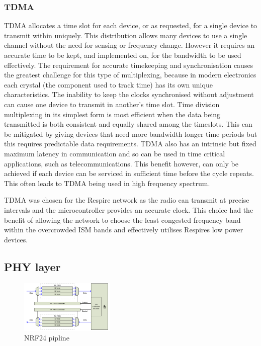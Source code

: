 \subsubsection{\acf{TDMA}}
\ac{TDMA} allocates a time slot for each device, or as requested, for a single device to transmit within
uniquely. This distribution allows many devices to use a single channel without the need for sensing
or frequency change. However it requires an accurate time to be kept, and implemented on, for the
bandwidth to be used effectively. The requirement for accurate timekeeping and synchronisation
causes the greatest challenge for this type of multiplexing, because in modern electronics each
crystal (the component used to track time) has its own unique characteristics. The inability to keep
the clocks synchronised without adjustment can cause one device to transmit in another's time slot.
Time division multiplexing in its simplest form is most efficient when the data being transmitted is
both consistent and equally shared among the timeslots. This can be mitigated by giving devices that
need more bandwidth longer time periods but this requires predictable data requirements.
\ac{TDMA} also has an intrinsic but fixed maximum latency in communication and so can be used in time
critical applications, such as telecommunications. This benefit however, can only be achieved if each
device can be serviced in sufficient time before the cycle repeats. This often leads to \ac{TDMA} being
used in high frequency spectrum.


\ac{TDMA} was chosen for the Respire network as the radio can transmit at precise intervals and the
microcontroller provides an accurate clock. This choice had the benefit of allowing the network to
choose the least congested frequency band within the overcrowded \ac{ISM} bands and effectively
utilises Respires low power devices.



\subsection{\acf{PHY} layer}

\begin{figure}
  \vspace{-10pt}
  \begin{center}
    \includegraphics[width=0.4\textwidth, keepaspectratio=true]{images/nrf24_pipline.png}
  \end{center}
  \caption[\ac{NRF24} Pipline]{\ac{NRF24} pipline}
  \vspace{-10pt}
\end{figure}

